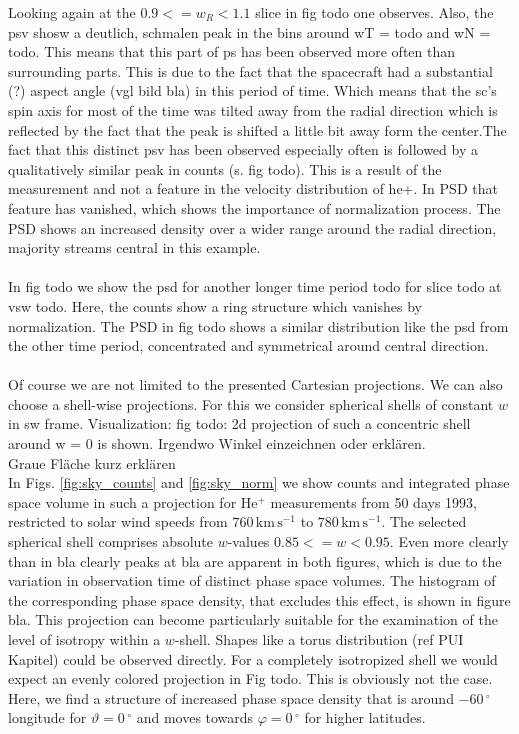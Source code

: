 Looking again at the $0.9 <= w_R < 1.1$ slice in fig todo one observes.
Also, the psv shosw a deutlich, schmalen peak in the bins around wT = todo and wN = todo. This means that this part of ps has been observed more often than surrounding parts. This is due to the fact that the spacecraft had a substantial (?) aspect angle (vgl bild bla) in this period of time. Which means that the sc's spin axis for most of the time was tilted away from the radial direction which is reflected by the fact that the peak is shifted a little bit away form the center.The fact that this distinct psv has been observed especially often is followed by a qualitatively similar peak in counts (s. fig todo). 
This is a result of the measurement and not a feature in the velocity distribution of he+. In PSD that feature has vanished, which shows the importance of normalization process. The PSD shows an increased density over a wider range around the radial direction, majority streams central in this example. \\ \\
In fig todo we show the psd for another longer time period todo for slice todo at vsw todo. Here, the counts show a ring structure which vanishes by normalization. 
The PSD in fig todo shows a similar distribution like the psd from the other time period, concentrated and symmetrical around central direction.
\\ \\
Of course we are not limited to the presented Cartesian projections.
We can also choose a shell-wise projections. For this we consider spherical shells of constant $w$ in sw frame. Visualization: fig todo: 2d projection of such a concentric shell around w = 0 is shown. Irgendwo Winkel einzeichnen oder erklären.
\\
Graue Fläche kurz erklären
\\
In Figs. \ref{fig:sky_counts} and \ref{fig:sky_norm} we show counts and integrated phase space volume in such a projection for $\mathrm{He^{+}}$ measurements from 50 days 1993, restricted to solar wind speeds from $760 \, \mathrm{km\,s^{-1}}$ to $780 \, \mathrm{km\,s^{-1}}$. The selected spherical shell comprises absolute $w$-values $0.85 <= w < 0.95$. Even more clearly than in bla clearly peaks at bla are apparent in both figures, which is due to the variation in observation time of distinct phase space volumes. The histogram of the corresponding phase space density, that excludes this effect, is shown in figure bla.
This projection can become particularly suitable for the examination of the level of isotropy within a $w$-shell. Shapes like a torus distribution (ref PUI Kapitel) could be observed directly. For a completely isotropized shell we would expect an evenly colored projection in Fig todo. This is obviously not the case. Here, we find a structure of increased phase space density that is around $-60\,^\circ$ longitude for $\vartheta = 0\,^\circ$ and moves towards $\varphi = 0\,^\circ$ for higher latitudes.
